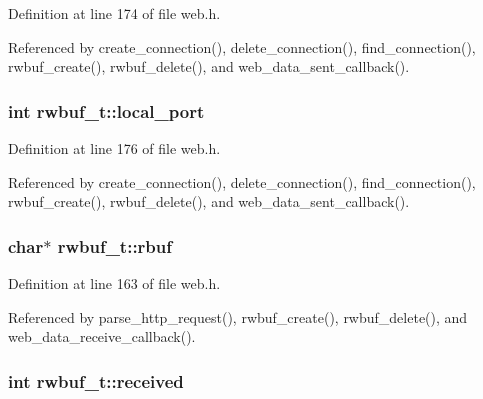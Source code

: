 Definition at line 174 of file web.\+h.



Referenced by create\+\_\+connection(), delete\+\_\+connection(), find\+\_\+connection(), rwbuf\+\_\+create(), rwbuf\+\_\+delete(), and web\+\_\+data\+\_\+sent\+\_\+callback().

\subsubsection[{\texorpdfstring{local\+\_\+port}{local_port}}]{\setlength{\rightskip}{0pt plus 5cm}int rwbuf\+\_\+t\+::local\+\_\+port}\hypertarget{structrwbuf__t_aac758cef289d022f4eb81d4c4fac7f04}{}\label{structrwbuf__t_aac758cef289d022f4eb81d4c4fac7f04}


Definition at line 176 of file web.\+h.



Referenced by create\+\_\+connection(), delete\+\_\+connection(), find\+\_\+connection(), rwbuf\+\_\+create(), rwbuf\+\_\+delete(), and web\+\_\+data\+\_\+sent\+\_\+callback().

\subsubsection[{\texorpdfstring{rbuf}{rbuf}}]{\setlength{\rightskip}{0pt plus 5cm}char$\ast$ rwbuf\+\_\+t\+::rbuf}\hypertarget{structrwbuf__t_afd83372241273849c9395d587b146021}{}\label{structrwbuf__t_afd83372241273849c9395d587b146021}


Definition at line 163 of file web.\+h.



Referenced by parse\+\_\+http\+\_\+request(), rwbuf\+\_\+create(), rwbuf\+\_\+delete(), and web\+\_\+data\+\_\+receive\+\_\+callback().

\subsubsection[{\texorpdfstring{received}{received}}]{\setlength{\rightskip}{0pt plus 5cm}int rwbuf\+\_\+t\+::received}\hypertarget{structrwbuf__t_ac76412a0fbf9dc009ae3f8bb20660883}{}\label{structrwbuf__t_ac76412a0fbf9dc009ae3f8bb20660883}



